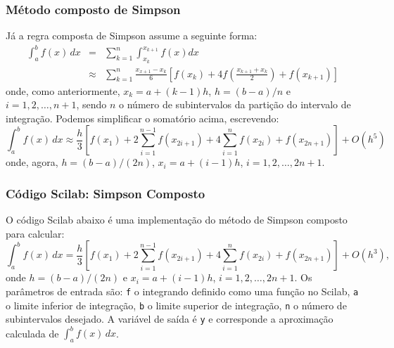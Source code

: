 \subsubsection{Método composto de Simpson}
Já a regra composta de Simpson assume a seguinte forma:
\begin{eqnarray*}
  \int_{a}^b f(x)\,dx &=& \sum_{k=1}^{n} \int_{x_k}^{x_{k+1}} f(x)dx \\
  &\approx& \sum_{k=1}^{n} \frac{x_{x+1}-x_k}{6}\left[f(x_k) + 4f\left(\frac{x_{k+1}+x_k}{2}\right)+f(x_{k+1})\right]
\end{eqnarray*}
onde, como anteriormente, $x_k = a + (k-1)h$, $h = (b-a)/n$ e $i = 1,2,\dotsc,n+1$, sendo $n$ o número de subintervalos da partição do intervalo de integração. Podemos simplificar o somatório acima, escrevendo:
\begin{equation*}
  \int_{a}^b f(x)\,dx \approx \frac{h}{3}\left[f(x_1) + 2\sum_{i=1}^{n-1} f(x_{2i+1}) + 4\sum_{i=1}^{n} f(x_{2i}) + f(x_{2n+1})\right] + O(h^5)
\end{equation*}
onde, agora, $h = (b-a)/(2n)$, $x_i = a + (i-1)h$, $i=1,2,\dotsc,2n+1$.

\ifisscilab
\subsubsection{Código Scilab: Simpson Composto}
O código Scilab abaixo é uma implementação do método de Simpson composto para calcular:
\begin{equation*}
  \int_a^b f(x)\,dx = \frac{h}{3}\left[f(x_1) + 2\sum_{i=1}^{n-1} f(x_{2i+1}) + 4\sum_{i=1}^{n} f(x_{2i}) + f(x_{2n+1})\right] + O(h^3),
\end{equation*}
onde $h = (b-a)/(2n)$ e $x_i = a + (i-1)h$, $i=1,2,\dotsc,2n+1$. Os parâmetros de entrada são: \verb+f+ o integrando definido como uma função no Scilab, \verb+a+ o limite inferior de integração, \verb+b+ o limite superior de integração, \verb+n+ o número de subintervalos desejado. A variável de saída é \verb+y+ e corresponde a aproximação calculada de $\int_a^b f(x)\, dx$.

\fi

